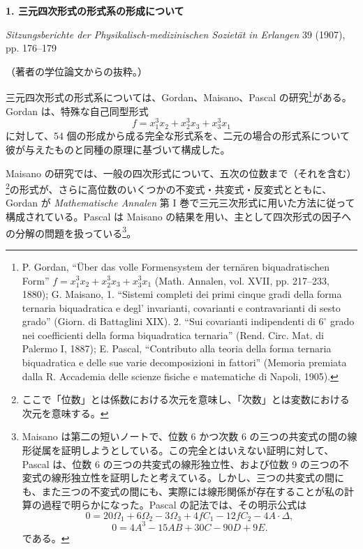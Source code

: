 \documentclass[11pt]{article}
\begin{document}
\begin{center}
{\Large\bfseries 1. 三元四次形式の形式系の形成について}\par
\vspace{1.5em}
\emph{Sitzungsberichte der Physikalisch-medizinischen Sozietät in Erlangen} 39 (1907), pp. 176--179
\end{center}

\vspace{3em}
\begin{center}
（著者の学位論文からの抜粋。）
\end{center}

三元四次形式の形式系については、Gordan、Maisano、Pascal の研究\footnote{P. Gordan, ``Über das volle Formensystem der ternären biquadratischen Form'' \(f=x_1^3x_2+x_2^3x_3+x_3^3x_1\) (Math. Annalen, vol. XVII, pp. 217--233, 1880); G. Maisano, 1. ``Sistemi completi dei primi cinque gradi della forma ternaria biquadratica e degl' invarianti, covarianti e contravarianti di sesto grado'' (Giorn. di Battaglini XIX). 2. ``Sui covarianti indipendenti di \(6^\circ\) grado nei coefficienti della forma biquadratica ternaria'' (Rend. Circ. Mat. di Palermo I, 1887); E. Pascal, ``Contributo alla teoria della forma ternaria biquadratica e delle sue varie decomposizioni in fattori'' (Memoria premiata dalla R. Accademia delle scienze fisiche e matematiche di Napoli, 1905).}がある。Gordan は、特殊な自己同型形式
\[
f=x_1^3x_2+x_2^3x_3+x_3^3x_1
\]
に対して、54 個の形成から成る完全な形式系を、二元の場合の形式系について彼が与えたものと同種の原理に基づいて構成した。

Maisano の研究では、一般の四次形式について、五次の位数まで（それを含む）\footnote{ここで「位数」とは係数における次元を意味し、「次数」とは変数における次元を意味する。}の形式が、さらに高位数のいくつかの不変式・共変式・反変式とともに、Gordan が \emph{Mathematische Annalen} 第 I 巻で三元三次形式に用いた方法に従って構成されている。Pascal は Maisano の結果を用い、主として四次形式の因子への分解の問題を扱っている\footnote{Maisano は第二の短いノートで、位数 6 かつ次数 6 の三つの共変式の間の線形従属を証明しようとしている。この完全とはいえない証明に対して、Pascal は、位数 6 の三つの共変式の線形独立性、および位数 9 の三つの不変式の線形独立性を証明したと考えている。しかし、三つの共変式の間にも、また三つの不変式の間にも、実際には線形関係が存在することが私の計算の過程で明らかになった。Pascal の記法では、その明示公式は
\[
0=20\Omega_1+6\Omega_2-3\Omega_3+4fC_1-12fC_2-4A\cdot\Delta,
\]
\[
0=4A^3-15AB+30C-90D+9E.
\]
である。}。
\end{document}
